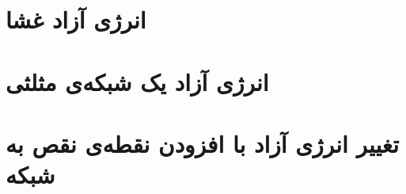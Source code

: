 \section{
انرژی آزاد غشا
}



\section{
انرژی آزاد یک شبکه‌ی مثلثی
}


\section{
تغییر انرژی آزاد با افزودن نقطه‌ی نقص به شبکه
}










